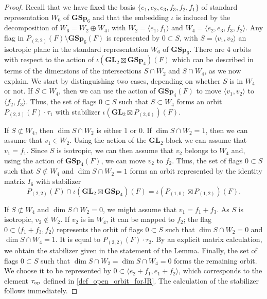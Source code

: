 \documentclass[11pt, reqno]{amsart}
\theoremstyle{plain}
\theoremstyle{definition}
\theoremstyle{remark}
\theoremstyle{plain}
\def\GSp{{\mathbf{GSp}}}
\def\GL{\mathbf{GL}}
\begin{document}
\begin{proof}
Recall that we have fixed the basis 
  $\{e_1,e_2,e_3,f_3,f_2,f_1\}$ of standard representation $W_6$ of $\GSp_6$ and that the embedding $\iota$ is induced by the decomposition of $W_6 = W_2 \oplus W_4$, with $W_2=\langle e_1,f_1\rangle$ and $W_4= \langle e_2,e_3,f_3,f_2\rangle$. 
Any flag in $P_{(2,2)}(F)\setminus  \GSp_6(F)$ is represented by $0 \subset S$, with $S = \langle v_1, v_2 \rangle$ an isotropic plane in the standard representation $W_6$ of $\GSp_6$. There are 4 orbits with respect to the action of $\iota\left(\GL_2\boxtimes\GSp_4\right)(F)$ which can be described in terms of the dimensions of the intersections $S \cap W_2$ and $S \cap W_4$, as we now explain. We start by distinguishing two cases, depending on whether $S$ is in $W_4$ or not. 
If $S \subset W_4$, then we can use the action of $\GSp_4(F)$ to move $\langle v_1, v_2 \rangle$ to $\langle f_2, f_3 \rangle$. Thus, the set of flags $0 \subset S$ such that $S \subset W_4$ forms an orbit $P_{(2,2)}(F) \cdot \tau_1$ with stabilizer $\iota\left(\GL_2\boxtimes P_{(2,0)}\right)(F)$. 

If $S \not\subset W_4$, then $\dim S \cap W_2$ is either 1 or 0. If $\dim S \cap W_2 = 1$, then we can assume that $v_1 \in W_2$. Using the action of the $\GL_2$-block we can assume that $v_1 = f_1$. Since $S$ is isotropic, we can then assume that $v_2$ belongs to $W_4$ and, using the action of $\GSp_4(F)$, we can move $v_2$ to $f_2$. Thus, the set of flags $0 \subset S$ such that $S \not\subset W_4$ and $\dim S \cap W_2 = 1$ forms an orbit represented by the identity matrix $I_6$ with stabilizer $$P_{(2,2)}(F) \cap \iota(\GL_2 \boxtimes \GSp_4)(F) = \iota(P_{(1,0)} \boxtimes P_{(1,2)})(F).$$

If $S\not\subset W_4$ and $\dim S \cap W_2 = 0$, we might assume that $v_1 = f_1 + f_3$. As $S$ is isotropic, $v_2 \not \in W_2$. If $v_2$ is in $W_4$, it can be mapped to $f_2$; the flag $0 \subset \langle f_1+f_3,f_2 \rangle$ represents the orbit of flags $0 \subset S$ such that $\dim S \cap W_2=0$ and $\dim S \cap W_4 =1$. It is equal to $P_{(2,2)}(F) \cdot \tau_2$. 
By an explicit matrix calculation, we obtain the stabilizer given in the statement of the Lemma. Finally, the set of flags $0 \subset S$ such that $\dim S \cap W_2 = \dim S \cap W_4 =0$ forms the remaining orbit. We choose it to be represented by $0 \subset \langle e_2+f_1, e_1+f_2 \rangle$, which corresponds to the element $\tau_{\rm op}$ defined in \eqref{def_open_orbit_forJR}. The calculation of the stabilizer follows immediately. 
\end{proof}
\end{document}
